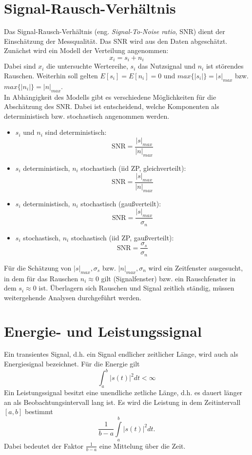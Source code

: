 \section{Signal-Rausch-Verhältnis}
Das Signal-Rausch-Verhältnis (eng. \textsl{Signal-To-Noise ratio}, SNR) dient der Einschätzung der Messqualität. Das SNR wird aus den Daten abgeschätzt. Zunächst wird ein Modell der Verteilung angenommen:
\[
x_i=s_i + n_i
\]
Dabei sind $x_i$ die untersuchte Wertereihe, $s_i$ das Nutzsignal und  $n_i$ ist störendes Rauschen. Weiterhin soll gelten $E[s_i]=E[n_i]=0$ und $max\{|s_i|\}=|s|_{max}$ bzw. $max\{|n_i|\}=|n|_{max}$.\\
In Abhängigkeit des Modells gibt es verschiedene Möglichkeiten für die Abschätzung des SNR. Dabei ist entscheidend, welche Komponenten als deterministisch bzw. stochastisch angenommen werden.
\begin {itemize}
\item $s_i$ und $n_i$ sind deterministisch:
\[
\mathrm{SNR} = \frac {|s|_{max}}{|n|_{max}}
\]
\item $s_i$ deterministisch, $n_i$ stochastisch (iid ZP, gleichverteilt):
\[
\mathrm{SNR} = \frac {|s|_{max}}{|n|_{max}}
\]
\item $s_i$ deterministisch, $n_i$ stochastisch (gaußverteilt):
\[
\mathrm{SNR} = \frac {|s|_{max}}{\sigma_n}
\]
\item $s_i$ stochastisch, $n_i$ stochastisch (iid ZP, gaußverteilt):
\[
\mathrm{SNR} = \frac {\sigma_s}{\sigma_n}
\]
\end{itemize}

Für die Schätzung von $|s|_{max}, \sigma_s$ bzw. $|n|_{max}, \sigma_n$ wird ein Zeitfenster ausgesucht, in dem für das Rauschen  $n_i\approx 0$ gilt (Signalfenster) bzw. ein Rauschfenster in dem $s_i \approx 0$ ist. Überlagern sich Rauschen und Signal zeitlich ständig, müssen weitergehende Analysen durchgeführt werden.


\section{Energie- und Leistungssignal}
Ein transientes Signal, d.h. ein Signal endlicher zeitlicher Länge, wird auch als Energiesignal bezeichnet.  Für die Energie gilt
\[
\int_a^b |s(t)|^2 dt < \infty
\]
Ein Leistungssignal besitzt eine unendliche zetliche Länge, d.h. es dauert länger an als Beobachtungsintervall lang ist. 
Es wird die Leistung in dem Zeitintervall $[a,b]$ bestimmt
\[
\frac{1}{b-a}\int\limits_a^b |s(t)|^2 dt.
\]
Dabei bedeutet der Faktor $\frac{1}{b-a}$ eine Mittelung über die Zeit.


